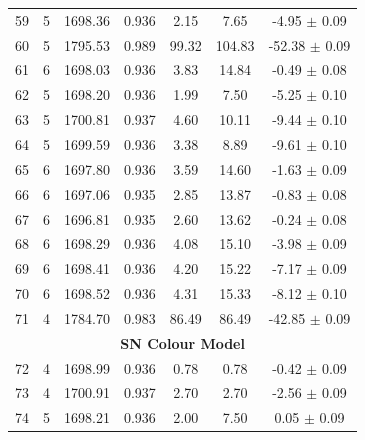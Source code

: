 \begin{longtable}{c c c c c c c}
    59 & 5 & 1698.36 & 0.936 & \cellcolor{aiclightorange}2.15 & \cellcolor{aiclightred}7.65 & \cellcolor{aiclightred}-4.95 $\pm$ 0.09 \\
    60 & 5 & 1795.53 & 0.989 & \cellcolor{aicred}99.32 & \cellcolor{aicred}104.83 & \cellcolor{aicred}-52.38 $\pm$ 0.09 \\
    61 & 6 & 1698.03 & 0.936 & \cellcolor{aiclightorange}3.83 & \cellcolor{aicred}14.84 & -0.49 $\pm$ 0.08 \\
    62 & 5 & 1698.20 & 0.936 & 1.99 & \cellcolor{aiclightred}7.50 & \cellcolor{aicred}-5.25 $\pm$ 0.10 \\
    63 & 5 & 1700.81 & 0.937 & \cellcolor{aicorange}4.60 & \cellcolor{aicred}10.11 & \cellcolor{aicred}-9.44 $\pm$ 0.10 \\
    64 & 5 & 1699.59 & 0.936 & \cellcolor{aiclightorange}3.38 & \cellcolor{aiclightred}8.89 & \cellcolor{aicred}-9.61 $\pm$ 0.10 \\
    65 & 6 & 1697.80 & 0.936 & \cellcolor{aiclightorange}3.59 & \cellcolor{aicred}14.60 & \cellcolor{aicorange}-1.63 $\pm$ 0.09 \\
    66 & 6 & 1697.06 & 0.935 & \cellcolor{aiclightorange}2.85 & \cellcolor{aicred}13.87 & -0.83 $\pm$ 0.08 \\
    67 & 6 & 1696.81 & 0.935 & \cellcolor{aiclightorange}2.60 & \cellcolor{aicred}13.62 & -0.24 $\pm$ 0.08 \\
    68 & 6 & 1698.29 & 0.936 & \cellcolor{aicorange}4.08 & \cellcolor{aicred}15.10 & \cellcolor{aiclightred}-3.98 $\pm$ 0.09 \\
    69 & 6 & 1698.41 & 0.936 & \cellcolor{aicorange}4.20 & \cellcolor{aicred}15.22 & \cellcolor{aicred}-7.17 $\pm$ 0.09 \\
    70 & 6 & 1698.52 & 0.936 & \cellcolor{aicorange}4.31 & \cellcolor{aicred}15.33 & \cellcolor{aicred}-8.12 $\pm$ 0.10 \\
    71 & 4 & 1784.70 & 0.983 & \cellcolor{aicred}86.49 & \cellcolor{aicred}86.49 & \cellcolor{aicred}-42.85 $\pm$ 0.09 \\
    \hline
    \multicolumn{7}{c}{\textbf{SN Colour Model}} \\
    \hline
    72 & 4 & 1698.99 & 0.936 & 0.78 & 0.78 & -0.42 $\pm$ 0.09 \\
    73 & 4 & 1700.91 & 0.937 & \cellcolor{aiclightorange}2.70 & \cellcolor{aiclightorange}2.70 & \cellcolor{aicorange}-2.56 $\pm$ 0.09 \\
    74 & 5 & 1698.21 & 0.936 & 2.00 & \cellcolor{aiclightred}7.50 & 0.05 $\pm$ 0.09 \\

\end{longtable}
